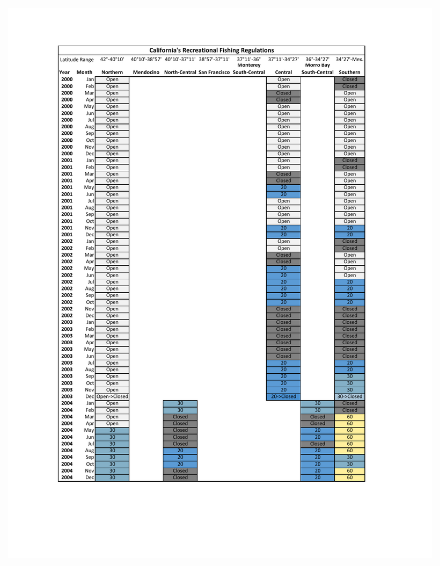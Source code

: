 \documentclass[12pt,]{article}
\begin{document}
\begin{figure}
\centering
\includegraphics{Figures/Rec_regs1.pdf}
\caption{\label{fig:Rec_regs1}}
\end{figure}

\FloatBarrier
\end{document}
